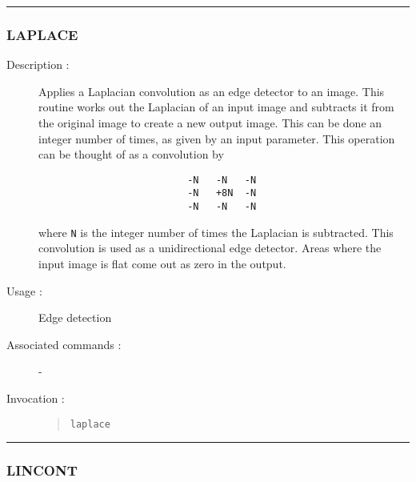 \hrule
\subsubsection*{\label{LAPLACE}LAPLACE}

\begin{description}

\item[Description :] Applies a Laplacian convolution as an edge
detector to an image. This routine works out the Laplacian of an input
image and subtracts it from the original image to create a new output
image. This can be done an integer number of times, as given by an
input parameter. This operation can be thought of as a convolution by

\begin{verbatim}
                          -N   -N   -N
                          -N   +8N  -N
                          -N   -N   -N
\end{verbatim}

where {\tt N} is the integer number of times the Laplacian is
subtracted. This convolution is used as a unidirectional edge detector.
Areas where the input image is flat come out as zero in the output.

\item[Usage :] Edge detection
\item[Associated commands :] -
\item[Invocation :]

\begin{quote}{\tt  laplace }\end{quote}

\end{description}

\hrule
\subsubsection*{\label{LINCONT}LINCONT}


